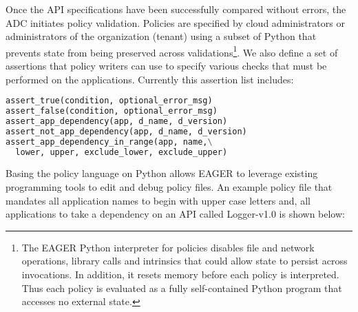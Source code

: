 Once the API specifications have been successfully compared without errors,
the ADC initiates policy validation. Policies are specified by cloud
administrators or administrators of the organization (tenant) 
using a subset of Python that prevents state from being preserved across
validations\footnote{The EAGER Python interpreter for policies disables file
and network operations, library calls and intrinsics that could allow
state to persist across invocations.  In addition, it resets memory before each
policy is interpreted. Thus each policy is evaluated as a fully self-contained
Python program that accesses no external state.}.
We also define a set of assertions
that policy writers can use to specify various checks that must be performed
on the applications. 
Currently this assertion list includes:
{\footnotesize 
\begin{lstlisting}[language=Python, frame=single]
assert_true(condition, optional_error_msg)
assert_false(condition, optional_error_msg)
assert_app_dependency(app, d_name, d_version)
assert_not_app_dependency(app, d_name, d_version)
assert_app_dependency_in_range(app, name,\
  lower, upper, exclude_lower, exclude_upper)
\end{lstlisting}
}


Basing the policy language on Python allows EAGER to leverage
existing programming tools to edit and debug policy files. An example policy
file that mandates all application names to begin with upper case letters and,
all applications to take a dependency on an API called Logger-v1.0 is shown
below:

